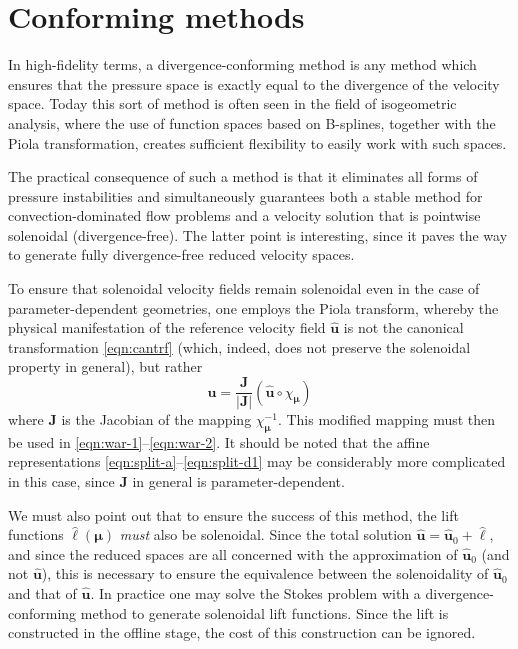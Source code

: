 \documentclass[onecolumn, twoside, a4paper, 11pt]{article}
\begin{document}
\section{Conforming methods}
\label{sec:conforming}

In high-fidelity terms, a divergence-conforming method is any method which
ensures that the pressure space is exactly equal to the divergence of the
velocity space. Today this sort of method is often seen in the field of
isogeometric analysis, where the use of function spaces based on B-splines,
together with the Piola transformation, creates sufficient flexibility to easily
work with such spaces.

The practical consequence of such a method is that it eliminates all forms of
pressure instabilities and simultaneously guarantees both a stable method for
convection-dominated flow problems and a velocity solution that is pointwise
solenoidal (divergence-free). The latter point is interesting, since it paves
the way to generate fully divergence-free reduced velocity spaces.

To ensure that solenoidal velocity fields remain solenoidal even in the case of
parameter-dependent geometries, one employs the Piola transform, whereby the
physical manifestation of the reference velocity field $\hat{\bm u}$ is not the
canonical transformation \eqref{eqn:cantrf} (which, indeed, does not
preserve the solenoidal property in general), but rather
\begin{equation}
  \label{eqn:piola}
  \bm u = \frac{\bm J}{|\bm J|} (\hat{\bm u} \circ \chi_{\bm\mu})
\end{equation}
where $\bm J$ is the Jacobian of the mapping $\chi_{\bm \mu}^{-1}$. This modified
mapping must then be used in \eqref{eqn:war-1}--\eqref{eqn:war-2}. It should be
noted that the affine representations \eqref{eqn:split-a}--\eqref{eqn:split-d1}
may be considerably more complicated in this case, since $\bm J$ in general is
parameter-dependent.

We must also point out that to ensure the success of this method, the lift
functions $\hat{\bm \ell}(\bm \mu)$ \emph{must} also be solenoidal. Since the total
solution $\hat{\bm u} = \hat{\bm u}_0 + \hat{\bm \ell}$, and since the reduced spaces are all
concerned with the approximation of $\hat{\bm u}_0$ (and not $\hat{\bm u}$), this is
necessary to ensure the equivalence between the solenoidality of $\hat{\bm u}_0$ and
that of $\hat{\bm u}$. In practice one may solve the Stokes problem with a
divergence-conforming method to generate solenoidal lift functions. Since the lift is constructed in
the offline stage, the cost of this construction can be ignored.
\end{document}
